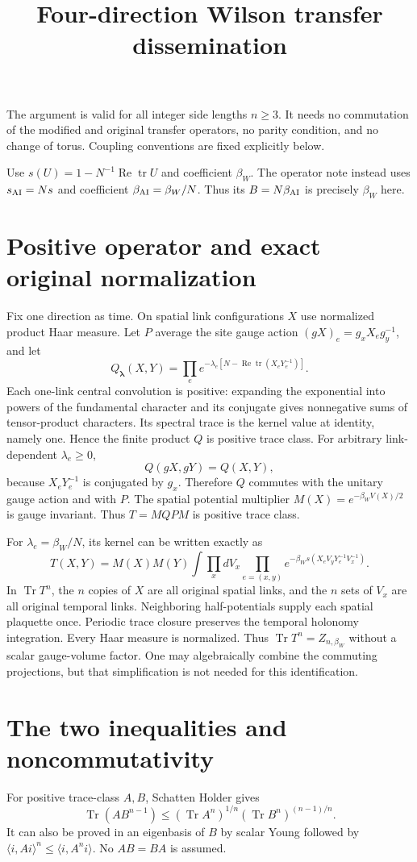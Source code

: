 \documentclass{article}
\title{Four-direction Wilson transfer dissemination}\author{}\date{}
\begin{document}
\maketitle
The argument is valid for all integer side lengths $n\geq3$. It needs no commutation of the modified and original transfer operators, no parity condition, and no change of torus. Coupling conventions are fixed explicitly below.

Use $s(U)=1-N^{-1}\operatorname{Re}\operatorname{tr}U$ and coefficient $\beta_W$. The operator note instead uses $s_{\rm AI}=Ns$ and coefficient $\beta_{\rm AI}=\beta_W/N$. Thus its $B=N\beta_{\rm AI}$ is precisely $\beta_W$ here.

\section{Positive operator and exact original normalization}
Fix one direction as time. On spatial link configurations $X$ use normalized product Haar measure. Let $P$ average the site gauge action $(gX)_e=g_xX_eg_y^{-1}$, and let
\[
 Q_{\boldsymbol\lambda}(X,Y)=\prod_e
 e^{-\lambda_e[N-\operatorname{Re}\operatorname{tr}(X_eY_e^{-1})]}.
\]
Each one-link central convolution is positive: expanding the exponential into powers of the fundamental character and its conjugate gives nonnegative sums of tensor-product characters. Its spectral trace is the kernel value at identity, namely one. Hence the finite product $Q$ is positive trace class. For arbitrary link-dependent $\lambda_e\geq0$,
\[
 Q(gX,gY)=Q(X,Y),
\]
because $X_eY_e^{-1}$ is conjugated by $g_x$. Therefore $Q$ commutes with the unitary gauge action and with $P$. The spatial potential multiplier $M(X)=e^{-\beta_W V(X)/2}$ is gauge invariant. Thus $T=MQPM$ is positive trace class.

For $\lambda_e=\beta_W/N$, its kernel can be written exactly as
\[
 T(X,Y)=M(X)M(Y)\int\prod_xdV_x
 \prod_{e=(x,y)}e^{-\beta_W s(X_eV_yY_e^{-1}V_x^{-1})}.
 \tag{1}
\]
In $\operatorname{Tr}T^n$, the $n$ copies of $X$ are all original spatial links, and the $n$ sets of $V_x$ are all original temporal links. Neighboring half-potentials supply each spatial plaquette once. Periodic trace closure preserves the temporal holonomy integration. Every Haar measure is normalized. Thus $\operatorname{Tr}T^n=Z_{n,\beta_W}$ without a scalar gauge-volume factor. One may algebraically combine the commuting projections, but that simplification is not needed for this identification.

\section{The two inequalities and noncommutativity}
For positive trace-class $A,B$, Schatten Holder gives
\[
 \operatorname{Tr}(AB^{n-1})\leq
 (\operatorname{Tr}A^n)^{1/n}(\operatorname{Tr}B^n)^{(n-1)/n}.
\]
It can also be proved in an eigenbasis of $B$ by scalar Young followed by
$\langle i,Ai\rangle^n\leq\langle i,A^ni\rangle$. No $AB=BA$ is assumed.
\end{document}
